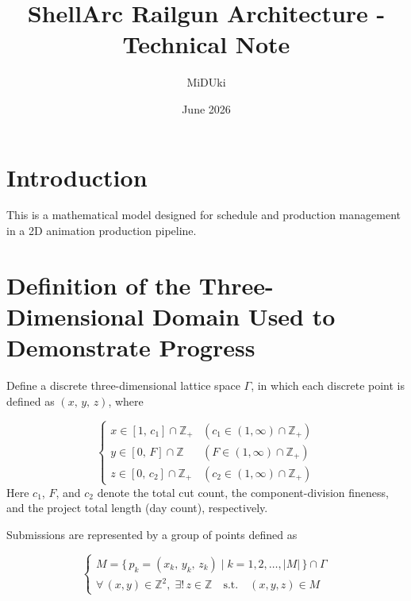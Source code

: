 \documentclass{article}
\title{ShellArc Railgun Architecture - Technical Note}
\author{MiDUki}
\date{June 2026}
\begin{document}
\maketitle

\section{Introduction}

This is a mathematical model designed for schedule and production management
in a 2D animation production pipeline.

\section{Definition of the Three-Dimensional Domain Used to Demonstrate Progress}

Define a discrete three-dimensional lattice space $\Gamma$, in which each
discrete point is defined as $(x,\, y,\, z)$, where

\begin{equation*}
\begin{cases}
    x \in [1,\, c_1] \cap \mathbb{Z}_{+}
        & (c_1 \in (1, \infty) \cap \mathbb{Z}_{+}) \\[4pt]
    y \in [0,\, F]  \cap \mathbb{Z}
        & (F   \in (1, \infty) \cap \mathbb{Z}_{+}) \\[4pt]
    z \in [0,\, c_2] \cap \mathbb{Z}_{+}
        & (c_2 \in (1, \infty) \cap \mathbb{Z}_{+})
\end{cases}
\end{equation*}
%
Here $c_1$, $F$, and $c_2$ denote the total cut count, the component-division
fineness, and the project total length (day count), respectively.

Submissions are represented by a group of points defined as

\begin{equation*}
\begin{cases}
    M = \bigl\{\, p_k = (x_k,\, y_k,\, z_k) \mid k = 1, 2, \ldots, |M| \,\bigr\} \cap \Gamma \\[6pt]
    \forall\, (x, y) \in \mathbb{Z}^{2},\;
    \exists!\, z \in \mathbb{Z} \quad \text{s.t.} \quad (x, y, z) \in M
\end{cases}
\end{equation*}
\end{document}

